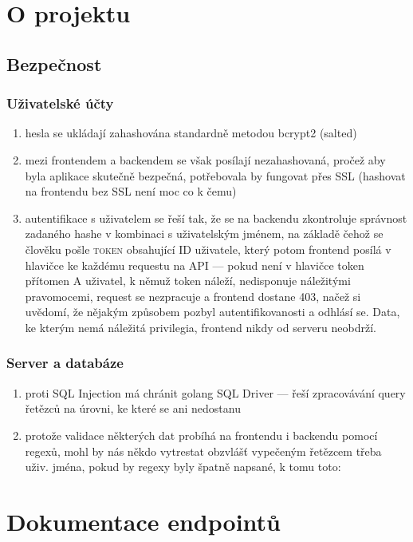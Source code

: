 \documentclass[10pt,a4paper]{memoir}
\author{Ondřej Tkaczyszyn}
\date{\today}
\begin{document}
\maketitle
\chapter{O projektu}
\section{Bezpečnost}
\subsection{Uživatelské účty}
\begin{enumerate}
	\item hesla se ukládají zahashována standardně metodou bcrypt2 (salted)
	\item mezi frontendem a backendem se však posílají nezahashovaná,
		pročež aby byla aplikace skutečně bezpečná, potřebovala by fungovat přes
		SSL (hashovat na frontendu bez SSL není moc co k čemu)
	\item autentifikace s uživatelem se řeší tak, že se na backendu zkontroluje
		správnost zadaného hashe v kombinaci s uživatelským jménem, na základě čehož
		se člověku pošle \textsc{token} obsahující ID uživatele, který potom frontend
		posílá v hlavičce ke každému requestu na API — pokud není v hlavičce token přítomen
		A uživatel, k němuž token náleží, nedisponuje náležitými pravomocemi,
		request se nezpracuje a frontend dostane 403, %
		načež si uvědomí, že nějakým způsobem pozbyl autentifikovanosti a odhlásí se.
		Data, ke kterým nemá náležitá privilegia, frontend nikdy od serveru neobdrží.
\end{enumerate}
\subsection{Server a databáze}
\begin{enumerate}
	\item proti SQL Injection má chránit golang SQL Driver — řeší zpracovávání
		query řetězců na úrovni, ke které se ani nedostanu
	\item protože validace některých dat probíhá na frontendu i backendu
		pomocí regexů, mohl by nás někdo vytrestat obzvlášť vypečeným řetězcem
		třeba uživ. jména, pokud by regexy byly špatně napsané, k tomu toto:
\end{enumerate}


\chapter{Dokumentace endpointů}
\end{document}
